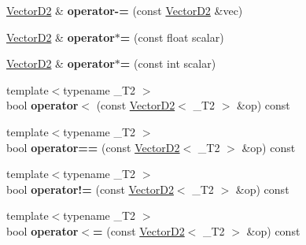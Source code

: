 \begin{DoxyCompactItemize}
\item 
\hypertarget{struct_vector_d2_aba280d8ac526e1ebbc36b07bfacb72d7}{
\hyperlink{struct_vector_d2}{VectorD2} \& {\bfseries operator-\/=} (const \hyperlink{struct_vector_d2}{VectorD2} \&vec)}
\label{struct_vector_d2_aba280d8ac526e1ebbc36b07bfacb72d7}

\item 
\hypertarget{struct_vector_d2_a9482faff7c02448da182bc33c63c220e}{
\hyperlink{struct_vector_d2}{VectorD2} \& {\bfseries operator$\ast$=} (const float scalar)}
\label{struct_vector_d2_a9482faff7c02448da182bc33c63c220e}

\item 
\hypertarget{struct_vector_d2_a31150716b8910e854fe9bc8806bb940e}{
\hyperlink{struct_vector_d2}{VectorD2} \& {\bfseries operator$\ast$=} (const int scalar)}
\label{struct_vector_d2_a31150716b8910e854fe9bc8806bb940e}

\item 
\hypertarget{struct_vector_d2_a5d51c96294559d1212708ac225417f2f}{
{\footnotesize template$<$typename \_\-T2 $>$ }\\bool {\bfseries operator$<$} (const \hyperlink{struct_vector_d2}{VectorD2}$<$ \_\-T2 $>$ \&op) const }
\label{struct_vector_d2_a5d51c96294559d1212708ac225417f2f}

\item 
\hypertarget{struct_vector_d2_aab46eb655bc0144b8af48e9e88fd4b01}{
{\footnotesize template$<$typename \_\-T2 $>$ }\\bool {\bfseries operator==} (const \hyperlink{struct_vector_d2}{VectorD2}$<$ \_\-T2 $>$ \&op) const }
\label{struct_vector_d2_aab46eb655bc0144b8af48e9e88fd4b01}

\item 
\hypertarget{struct_vector_d2_a82e0fe55ae928ea8ccb96ec924a27191}{
{\footnotesize template$<$typename \_\-T2 $>$ }\\bool {\bfseries operator!=} (const \hyperlink{struct_vector_d2}{VectorD2}$<$ \_\-T2 $>$ \&op) const }
\label{struct_vector_d2_a82e0fe55ae928ea8ccb96ec924a27191}

\item 
\hypertarget{struct_vector_d2_aca79ecd4d41fe0885e654143d5be9d35}{
{\footnotesize template$<$typename \_\-T2 $>$ }\\bool {\bfseries operator$<$=} (const \hyperlink{struct_vector_d2}{VectorD2}$<$ \_\-T2 $>$ \&op) const }
\label{struct_vector_d2_aca79ecd4d41fe0885e654143d5be9d35}

\end{DoxyCompactItemize}
